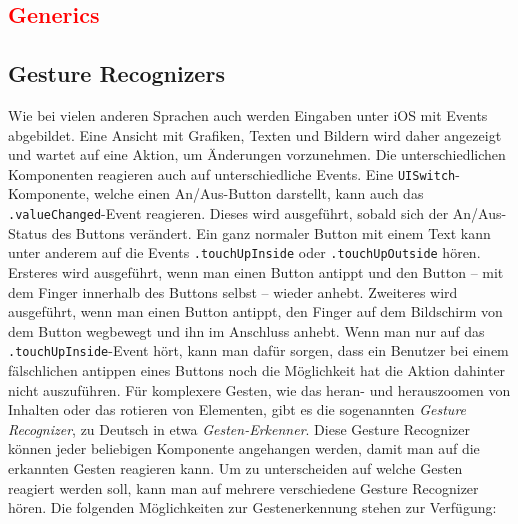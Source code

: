 \subsection{\textcolor{red}{Generics}}
\label{subsec:generics}

\subsection{Gesture Recognizers}
\label{subsec:gesturerecognizer}
Wie bei vielen anderen Sprachen auch werden Eingaben unter iOS mit Events abgebildet.
Eine Ansicht mit Grafiken, Texten und Bildern wird daher angezeigt und wartet auf eine Aktion, um Änderungen vorzunehmen.
Die unterschiedlichen Komponenten reagieren auch auf unterschiedliche Events.
Eine \texttt{UISwitch}-Komponente, welche einen An/Aus-Button darstellt, kann auch das \texttt{.valueChanged}-Event reagieren.
Dieses wird ausgeführt, sobald sich der An/Aus-Status des Buttons verändert.
Ein ganz normaler Button mit einem Text kann unter anderem auf die Events \texttt{.touchUpInside} oder \texttt{.touchUpOutside} hören.
Ersteres wird ausgeführt, wenn man einen Button antippt und den Button – mit dem Finger innerhalb des Buttons selbst – wieder anhebt.
Zweiteres wird ausgeführt, wenn man einen Button antippt, den Finger auf dem Bildschirm von dem Button wegbewegt und ihn im Anschluss anhebt.
Wenn man nur auf das \texttt{.touchUpInside}-Event hört, kann man dafür sorgen, dass ein Benutzer bei einem fälschlichen antippen eines Buttons noch die Möglichkeit hat die Aktion dahinter nicht auszuführen.\pbreak%
%
Für komplexere Gesten, wie das heran- und herauszoomen von Inhalten oder das rotieren von Elementen, gibt es die sogenannten \emph{Gesture Recognizer}, zu Deutsch in etwa \emph{Gesten-Erkenner}.
Diese Gesture Recognizer können jeder beliebigen Komponente angehangen werden, damit man auf die erkannten Gesten reagieren kann.
Um zu unterscheiden auf welche Gesten reagiert werden soll, kann man auf mehrere verschiedene Gesture Recognizer hören.
Die folgenden Möglichkeiten zur Gestenerkennung stehen zur Verfügung:
